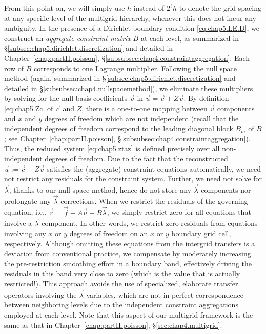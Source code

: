 From this point on, we will simply use $h$ instead of $2^{\ell}h$ to denote the grid spacing at any specific level of the multigrid hierarchy, whenever this does not incur any ambiguity. In the presence of a Dirichlet boundary condition \eqref{eq:chap5.LE.D}, we construct an \emph{aggregate constraint matrix} $B$ at each level, as summarized in \S\ref{subsec:chap5.dirichlet.discretization} and detailed in Chapter~\ref{chap:partII.poisson}, \S\ref{subsubsec:chap4.constraintaggregation}. Each row of $B$ corresponds to one Lagrange multiplier. Following the null space method (again, summarized in \S\ref{subsec:chap5.dirichlet.discretization} and detailed in \S\ref{subsubsec:chap4.nullspacemethod}), we eliminate these multipliers by solving for the null basis coefficients $\vec{v}$ in $\vec{u} = \vec{c} + Z \vec{v}$. By definition \eqref{eq:chap5.Zc} of $\vec{c}$ and $Z$, there is a one-to-one mapping between $\vec{v}$ components and $x$ and $y$ degrees of freedom which are not independent (recall that the independent degrees of freedom correspond to the leading diagonal block $B_m$ of $B$; see Chapter~\ref{chap:partII.poisson}, \S\ref{subsubsec:chap4.constraintaggregation}). Thus, the reduced system \eqref{eq:chap5.ztaz} is defined precisely over all non-independent degrees of freedom. Due to the fact that the reconstructed $\vec{u} := \vec{c} + Z \vec{v}$ satisfies the (aggregate) constraint equations automatically, we need not restrict any residuals for the constraint system. Further, we need not solve for $\vec{\lambda}$, thanks to our null space method, hence do not store any $\vec{\lambda}$ components nor prolongate any $\vec{\lambda}$ corrections. When we restrict the residuals of the governing equation, i.e., $\vec{r} = \vec{f} - A \vec{u} - B \vec{\lambda}$, we simply restrict zero for all equations that involve a $\vec{\lambda}$ component. In other words, we restrict zero residuals from equations involving any $x$ or $y$ degrees of freedom on an $x$ or $y$ boundary grid cell, respectively. Although omitting these equations from the intergrid transfers is a deviation from conventional practice, we compensate by moderately increasing the pre-restriction smoothing effort in a boundary band, effectively driving the residuals in this band very close to zero (which is the value that is actually restricted!). This approach avoids the use of specialized, elaborate transfer operators involving the $\vec{\lambda}$ variables, which are not in perfect correspondence between neighboring levels due to the independent constraint aggregations employed at each level. Note that this aspect of our multigrid framework is the same as that in Chapter~\ref{chap:partII.poisson}, \S\ref{sec:chap4.multigrid}.

